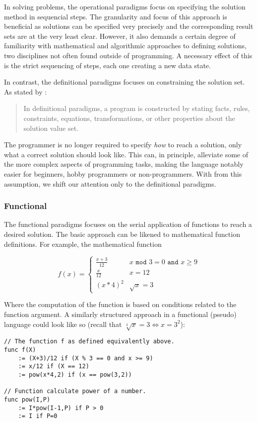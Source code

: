 In solving problems, the operational paradigms focus on specifying the solution method in sequencial steps. The granularity and focus of this approach is beneficial as solutions can be specified very precisely and the corresponding result sets are at the very least clear. However, it also demands a certain degree of familiarity with mathematical and algorithmic approaches to defining solutions, two disciplines not often found outside of programming. A necessary effect of this is the strict sequencing of steps, each one creating a new data state.

In contrast, the definitional paradigms focuses on constraining the solution set. As stated by \citep{paradigms1992}:

\begin{quote}
In definitional paradigms, a program is constructed by stating facts, rules, constraints, equations, transformations, or other properties about the solution value set.
\end{quote}

The programmer is no longer required to specify \emph{how} to reach a solution, only what a correct solution should look like. This can, in principle, alleviate some of the more complex aspects of programming tasks, making the language notably easier for beginners, hobby programmers or non-programmers. With from this assumption, we shift our attention only to the definitional paradigms.

\subsubsection*{Functional}
The functional paradigms focuses on the serial application of functions to reach a desired solution. The basic approach can be likened to mathematical function definitions. For example, the mathematical function

\[
f(x) =
\begin{cases} \frac{x+3}{12} & x \texttt{ mod } 3 = 0 \texttt{ and } x \geq 9
\\
\frac{x}{12} & x = 12
\\
(x * 4)^2 & \sqrt{x} = 3
\end{cases}
\]

Where the computation of the function is based on conditions related to the function argument. A similarly structured approach in a functional (pseudo) language could look like so (recall that $\sqrt[2]{x} = 3 \Leftrightarrow x = 3^2$):

\begin{lstlisting}
// The function f as defined equivalently above.
func f(X)
	:= (X+3)/12 if (X % 3 == 0 and x >= 9)
	:= x/12 if (X == 12)
	:= pow(x*4,2) if (x == pow(3,2))

// Function calculate power of a number.
func pow(I,P)
	:= I*pow(I-1,P) if P > 0
	:= I if P=0
\end{lstlisting}

